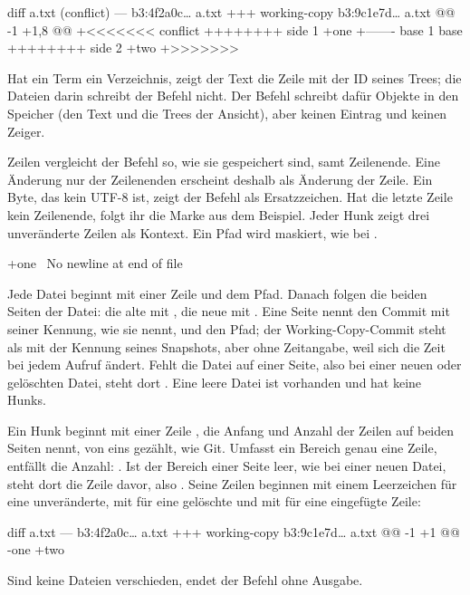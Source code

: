 \starttyping
diff a.txt (conflict)
--- b3:4f2a0c… a.txt
+++ working-copy b3:9c1e7d… a.txt
@@ -1 +1,8 @@
+<<<<<<< conflict
++++++++ side 1
+one
+------- base 1
 base
++++++++ side 2
+two
+>>>>>>>
\stoptyping

Hat ein Term ein Verzeichnis, zeigt der Text die Zeile 
mit der ID seines Trees; die Dateien darin schreibt der Befehl nicht.
Der Befehl schreibt dafür Objekte in den Speicher (den Text und die Trees der Ansicht),
aber keinen Eintrag und keinen Zeiger.

Zeilen vergleicht der Befehl so, wie sie gespeichert sind, samt Zeilenende.
Eine Änderung nur der Zeilenenden erscheint deshalb als Änderung der Zeile.
Ein Byte, das kein UTF-8 ist, zeigt der Befehl als Ersatzzeichen.
Hat die letzte Zeile kein Zeilenende,
folgt ihr die Marke aus dem Beispiel. Jeder Hunk zeigt drei unveränderte Zeilen als Kontext.
Ein Pfad wird maskiert, wie bei .

\starttyping
+one
\ No newline at end of file
\stoptyping

Jede Datei beginnt mit einer Zeile  und dem Pfad. Danach folgen die beiden Seiten
der Datei: die alte mit \type{---}, die neue mit \type{+++}. Eine Seite nennt den Commit mit
seiner Kennung, wie  sie nennt, und den Pfad; der Working-Copy-Commit steht als
 mit der Kennung seines Snapshots,
aber ohne Zeitangabe, weil sich die Zeit bei jedem Aufruf ändert.
Fehlt die Datei auf einer Seite, also bei einer neuen oder gelöschten Datei,
steht dort . Eine leere Datei ist vorhanden und hat keine Hunks.

Ein Hunk beginnt mit einer Zeile , die Anfang und Anzahl der Zeilen auf beiden
Seiten nennt, von eins gezählt, wie Git.
Umfasst ein Bereich genau eine Zeile, entfällt die Anzahl:
. Ist der Bereich einer Seite leer, wie bei einer neuen Datei,
steht dort die Zeile davor, also . Seine Zeilen beginnen mit einem Leerzeichen für eine
unveränderte, mit \type{-} für eine gelöschte und mit \type{+} für eine eingefügte Zeile:

\starttyping
diff a.txt
--- b3:4f2a0c… a.txt
+++ working-copy b3:9c1e7d… a.txt
@@ -1 +1 @@
-one
+two
\stoptyping

Sind keine Dateien verschieden, endet der Befehl ohne Ausgabe.

